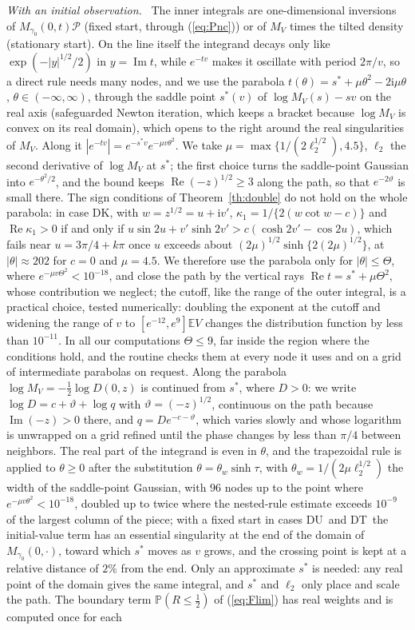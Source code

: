 \documentclass[ecta,nameyear,final,supplement]{econsocart}
\newcommand{\E}{{\mathbb E}}
\newcommand{\PP}{{\mathbb P}}
\newcommand{\iu}{{\mathrm i}}
\newcommand{\Rea}{\operatorname{Re}}
\newcommand{\Ima}{\operatorname{Im}}
\newcommand{\Fk}{\textsf{\upshape DK}}
\newcommand{\Fu}{\textsf{\upshape DU}}
\newcommand{\Ft}{\textsf{\upshape DT}}
\newcommand{\cP}{\mathcal{P}}
\theoremstyle{plain}
\theoremstyle{definition}
\newcommand{\runin}[1]{\par\medskip\noindent\textit{#1.}\ \ignorespaces}
\begin{document}
\runin{With an initial observation}  The inner integrals are one-dimensional inversions of $M_{\gamma_0}(0,t)\cP$ (fixed start, through (\ref{eq:Pnc})) or of $M_V$ times the tilted density (stationary start).  On the line itself the integrand decays only like $\exp(-|y|^{1/2}/2)$ in $y=\Ima t$, while $e^{-tv}$ makes it oscillate with period $2\pi/v$, so a direct rule needs many nodes, and we use the parabola $t(\theta)=s^*+\mu\theta^2-2\iu\mu\theta$, $\theta\in(-\infty,\infty)$, through the saddle point $s^*(v)$ of $\log M_V(s)-sv$ on the real axis (safeguarded Newton iteration, which keeps a bracket because $\log M_V$ is convex on its real domain), which opens to the right around the real singularities of $M_V$.  Along it $|e^{-tv}|=e^{-s^*v}e^{-\mu v\theta^2}$.  We take $\mu=\max\{1/(2\ell_2^{1/2}),4.5\}$, $\ell_2$ the second derivative of $\log M_V$ at $s^*$; the first choice turns the saddle-point Gaussian into $e^{-\theta^2/2}$, and the bound keeps $\Rea(-z)^{1/2}\ge3$ along the path, so that $e^{-2\vartheta}$ is small there.  The sign conditions of Theorem~\ref{th:double} do not hold on the whole parabola: in case \Fk, with $w=z^{1/2}=u+\iu v'$, $\kappa_1=1/\{2(w\cot w-c)\}$ and $\Rea\kappa_1>0$ if and only if $u\sin2u+v'\sinh2v'>c(\cosh2v'-\cos2u)$, which fails near $u=3\pi/4+k\pi$ once $u$ exceeds about $(2\mu)^{1/2}\sinh\{2(2\mu)^{1/2}\}$, at $|\theta|\approx202$ for $c=0$ and $\mu=4.5$.  We therefore use the parabola only for $|\theta|\le\Theta$, where $e^{-\mu v\Theta^2}<10^{-18}$, and close the path by the vertical rays $\Rea t=s^*+\mu\Theta^2$, whose contribution we neglect; the cutoff, like the range of the outer integral, is a practical choice, tested numerically: doubling the exponent at the cutoff and widening the range of $v$ to $[e^{-12},e^9]\E V$ changes the distribution function by less than $10^{-11}$.  In all our computations $\Theta\le9$, far inside the region where the conditions hold, and the routine checks them at every node it uses and on a grid of intermediate parabolas on request.  Along the parabola $\log M_V=-\frac12\log D(0,z)$ is continued from $s^*$, where $D>0$: we write $\log D=c+\vartheta+\log q$ with $\vartheta=(-z)^{1/2}$, continuous on the path because $\Ima(-z)>0$ there, and $q=De^{-c-\vartheta}$, which varies slowly and whose logarithm is unwrapped on a grid refined until the phase changes by less than $\pi/4$ between neighbors.  The real part of the integrand is even in $\theta$, and the trapezoidal rule is applied to $\theta\ge0$ after the substitution $\theta=\theta_w\sinh\tau$, with $\theta_w=1/(2\mu\ell_2^{1/2})$ the width of the saddle-point Gaussian, with $96$ nodes up to the point where $e^{-\mu v\theta^2}<10^{-18}$, doubled up to twice where the nested-rule estimate exceeds $10^{-9}$ of the largest column of the piece; with a fixed start in cases \Fu\ and \Ft\ the initial-value term has an essential singularity at the end of the domain of $M_{\gamma_0}(0,\cdot)$, toward which $s^*$ moves as $v$ grows, and the crossing point is kept at a relative distance of $2\%$ from the end.  Only an approximate $s^*$ is needed: any real point of the domain gives the same integral, and $s^*$ and $\ell_2$ only place and scale the path.  The boundary term $\PP(R\le\frac12)$ of (\ref{eq:Flim}) has real weights and is computed once for each 
\end{document}
